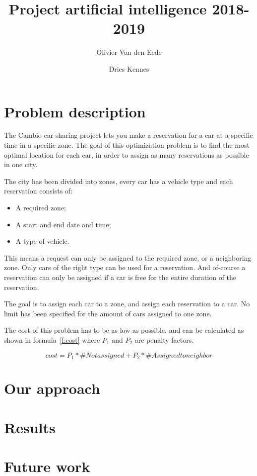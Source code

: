 \documentclass[11pt]{article}
\begin{document}
\title{Project artificial intelligence 2018-2019}
\author[1]{Olivier Van den Eede}
\author[1]{Dries Kennes}
\date{}
\maketitle

\section{Problem description}
    The Cambio car sharing project lets you make a reservation for a car at a specific time in a specific zone.
    The goal of this optimization problem is to find the most optimal location for each car, in order to assign as many reservations as possible
    in one city.
    
    The city has been divided into zones, every car has a vehicle type and each reservation consists of:
    \begin{itemize}
        \item A required zone;
        \item A start and end date and time;
        \item A type of vehicle.
    \end{itemize} 

    This means a request can only be assigned to the required zone, or a neighboring zone. Only cars of the right type can be used for a reservation.
    And of-course a reservation can only be assigned if a car is free for the entire duration of the reservation.

    The goal is to assign each car to a zone, and assign each reservation to a car. No limit has been specified for the amount of cars assigned to one zone.

    The cost of this problem has to be as low as possible, and can be calculated as shown in formula~\ref{f:cost} where $P_1$ and $P_2$ are penalty factors.

    \begin{equation}
        \label{f:cost}
        cost = P_1 * \#Not assigned + P_2 * \#Assigned to neighbor
    \end{equation}

\section{Our approach}

\section{Results}

\section{Future work}
\end{document}
